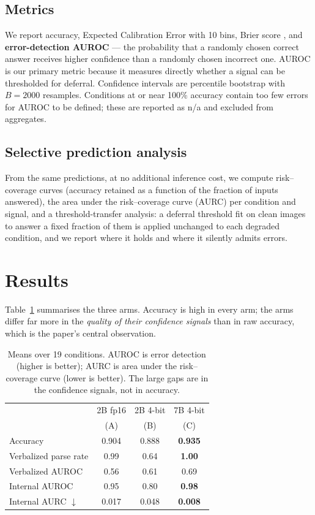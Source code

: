 \documentclass[11pt]{article}
\begin{document}
\subsection{Metrics}
We report accuracy, Expected Calibration Error \citep{naeini2015obtaining} with
10 bins, Brier score \citep{brier1950verification}, and \textbf{error-detection
AUROC} --- the probability that a randomly chosen correct answer receives higher
confidence than a randomly chosen incorrect one. AUROC is our primary metric
because it measures directly whether a signal can be thresholded for deferral.
Confidence intervals are percentile bootstrap with $B=2000$ resamples.
Conditions at or near 100\% accuracy contain too few errors for AUROC to be
defined; these are reported as n/a and excluded from aggregates.

\subsection{Selective prediction analysis}
From the same predictions, at no additional inference cost, we compute
risk--coverage curves (accuracy retained as a function of the fraction of inputs
answered), the area under the risk--coverage curve (AURC) per condition and
signal, and a threshold-transfer analysis: a deferral threshold fit on clean
images to answer a fixed fraction of them is applied unchanged to each degraded
condition, and we report where it holds and where it silently admits errors.

\section{Results}
\label{sec:results}
Table~\ref{tab:means} summarises the three arms. Accuracy is high in every arm;
the arms differ far more in the \emph{quality of their confidence signals} than
in raw accuracy, which is the paper's central observation.

\begin{table}[t]
\centering
\small
\begin{tabular}{@{}lccc@{}}
\toprule
 & 2B fp16 & 2B 4-bit & 7B 4-bit \\
 & (A) & (B) & (C) \\
\midrule
Accuracy               & 0.904 & 0.888 & \textbf{0.935} \\
Verbalized parse rate  & 0.99  & 0.64  & \textbf{1.00}  \\
Verbalized AUROC       & 0.56  & 0.61  & 0.69           \\
Internal AUROC         & 0.95  & 0.80  & \textbf{0.98}  \\
Internal AURC $\downarrow$ & 0.017 & 0.048 & \textbf{0.008} \\
\bottomrule
\end{tabular}
\caption{Means over 19 conditions. AUROC is error detection (higher is better);
AURC is area under the risk--coverage curve (lower is better). The large gaps are
in the confidence signals, not in accuracy.}
\label{tab:means}
\end{table}
\end{document}
